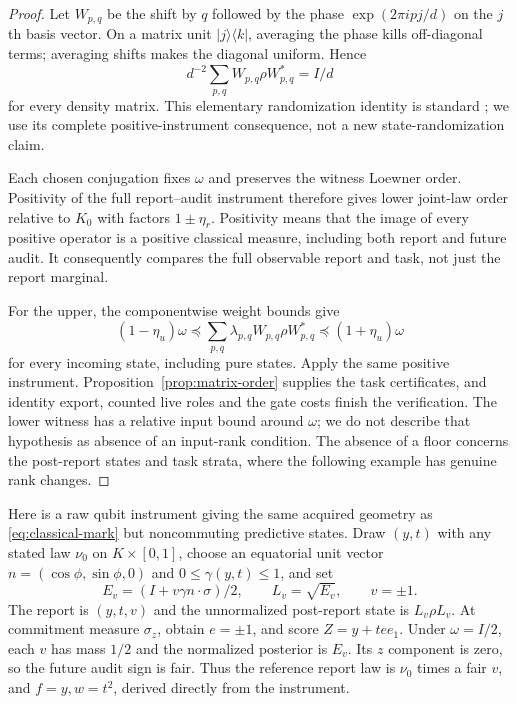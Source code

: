 \begin{proof}
Let $W_{p,q}$ be the shift by $q$ followed by the phase $\exp(2\pi ipj/d)$ on the $j$th basis vector. On a matrix unit $|j\rangle\langle k|$, averaging the phase kills off-diagonal terms; averaging shifts makes the diagonal uniform. Hence
\[
 d^{-2}\sum_{p,q}W_{p,q}\rho W_{p,q}^*=I/d
\]
for every density matrix. This elementary randomization identity is standard \cite{AMTW}; we use its complete positive-instrument consequence, not a new state-randomization claim.

Each chosen conjugation fixes $\omega$ and preserves the witness Loewner order. Positivity of the full report--audit instrument therefore gives lower joint-law order relative to $K_0$ with factors $1\pm\eta_r$. Positivity means that the image of every positive operator is a positive classical measure, including both report and future audit. It consequently compares the full observable report and task, not just the report marginal.

For the upper, the componentwise weight bounds give
\[
 (1-\eta_u)\omega
 \preccurlyeq\sum_{p,q}\lambda_{p,q}W_{p,q}\rho W_{p,q}^*
 \preccurlyeq(1+\eta_u)\omega
\]
for every incoming state, including pure states. Apply the same positive instrument. Proposition~\ref{prop:matrix-order} supplies the task certificates, and identity export, counted live roles and the gate costs finish the verification. The lower witness has a relative input bound around $\omega$; we do not describe that hypothesis as absence of an input-rank condition. The absence of a floor concerns the post-report states and task strata, where the following example has genuine rank changes.
\end{proof}

Here is a raw qubit instrument giving the same acquired geometry as \eqref{eq:classical-mark} but noncommuting predictive states. Draw $(y,t)$ with any stated law $\nu_0$ on $K\times[0,1]$, choose an equatorial unit vector $n=(\cos\phi,\sin\phi,0)$ and $0\le\gamma(y,t)\le1$, and set
\[
 E_v=(I+v\gamma n\cdot\sigma)/2,\qquad L_v=\sqrt{E_v},\qquad v=\pm1.
\]
The report is $(y,t,v)$ and the unnormalized post-report state is $L_v\rho L_v$. At commitment measure $\sigma_z$, obtain $e=\pm1$, and score $Z=y+te e_1$. Under $\omega=I/2$, each $v$ has mass $1/2$ and the normalized posterior is $E_v$. Its $z$ component is zero, so the future audit sign is fair. Thus the reference report law is $\nu_0$ times a fair $v$, and $f=y,w=t^2$, derived directly from the instrument.

